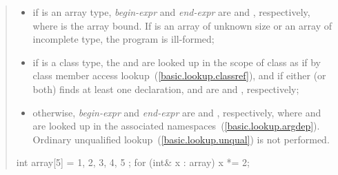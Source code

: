 \begin{quote}
\begin{itemize}
\item if  is an array type, \textit{begin-expr} and \textit{end-expr} are
 and , respectively, where  is
the array bound. If  is an array of unknown size or an array of
incomplete type, the program is ill-formed;

\item if  is a class type, the 
 and  are looked up in the scope of class 
as if by class member access lookup~(\ref{basic.lookup.classref}), and if either
(or both) finds at least one declaration,  and
 are  and ,
respectively;

\item otherwise, \textit{begin-expr} and \textit{end-expr} are 
and , respectively, where  and  are looked
up in the associated namespaces~(\ref{basic.lookup.argdep}).
\enternote Ordinary unqualified lookup~(\ref{basic.lookup.unqual}) is not
performed. \exitnote
\end{itemize}

\enterexample
\begin{codeblock}
int array[5] = { 1, 2, 3, 4, 5 };
for (int& x : array)
  x *= 2;
\end{codeblock}
\exitexample%

\end{quote}


